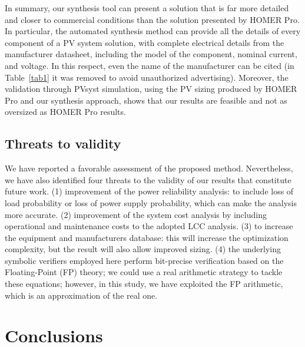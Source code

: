 \documentclass[runningheads]{llncs}
\begin{document}
In summary, our synthesis tool can present a solution that is far more detailed and closer to commercial conditions than the solution presented by HOMER Pro. In particular, the automated synthesis method can provide all the details of every component of a PV system solution, with complete electrical details from the manufacturer datasheet, including the model of the component, nominal current, and voltage. In this respect, even the name of the manufacturer can be cited (in Table~\ref{tab1} it was removed to avoid unauthorized advertising). Moreover, the validation through PVsyst simulation, using the PV sizing produced by HOMER Pro and our synthesis approach, shows that our results are feasible and not as oversized as HOMER Pro results.

\subsection{Threats to validity} 

We have reported a favorable assessment of the proposed method. Nevertheless, we have also identified four threats to the validity of our results that constitute future work. (1) improvement of the power reliability analysis: to include loss of load probability or loss of power supply probability, which can make the analysis more accurate. (2) improvement of the system cost analysis by including operational and maintenance costs to the adopted LCC analysis. (3) to increase the equipment and manufacturers database: this will increase the optimization complexity, but the result will also allow improved sizing. (4) the underlying symbolic verifiers employed here perform bit-precise verification based on the Floating-Point (FP) theory; we could use a real arithmetic strategy to tackle these equations; however, in this study, we have exploited the FP arithmetic, which is an approximation of the real one. 

\section{Conclusions} 
\end{document}
